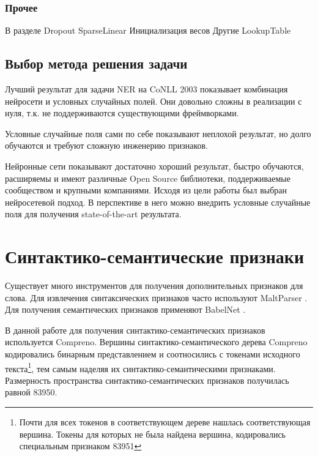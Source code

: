   \subsubsection{Прочее}

  В разделе
  Dropout
  SparseLinear
  Инициализация весов
  Другие LookupTable



    \subsection{Выбор метода решения задачи}

      Лучший результат для задачи NER на CoNLL 2003 показывает комбинация нейросети и
      условных случайных полей. Они довольно сложны в реализации с нуля, т.к. не поддерживаются
      существующими фреймворками.

      Условные случайные поля сами по себе показывают неплохой
      результат, но долго обучаются и требуют сложную инженерию признаков.

      Нейронные сети показывают достаточно хороший результат, быстро обучаются,
      расширяемы и
      имеют различные Open Source библиотеки, поддерживаемые сообществом и крупными
      компаниями.
      Исходя из цели работы был выбран нейросетевой подход. В перспективе в него
      можно внедрить условные случайные поля для получения state-of-the-art результата.

  \section{Синтактико-семантические признаки}
    Существует много инструментов для получения дополнительных признаков для слова.
    Для извлечения синтаксических признаков часто используют MaltParser \citep{nivre2006maltparser}.
    Для получения семантических признаков применяют BabelNet \citep{navigli2010babelnet}.

    В данной работе для получения синтактико-семантических признаков используется Compreno.
    Вершины синтактико-семантического дерева Compreno кодировались бинарным представлением
    и соотносились с токенами исходного
    текста\footnote{Почти для всех токенов в соответствующем дереве нашлась соответствующая вершина.
    Токены для которых не была найдена вершина, кодировались специальным признаком 83951},
    тем самым наделяя их синтактико-се\-ман\-ти\-ческими признаками.
    Размерность пространства синтактико-се\-ман\-ти\-ческих признаков получилась равной 83950.

